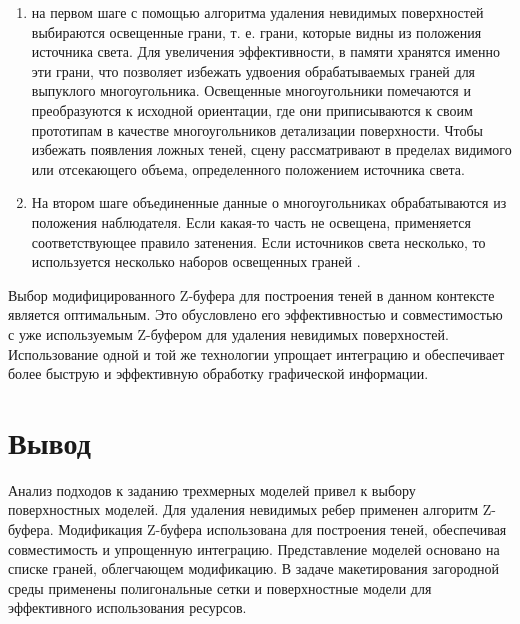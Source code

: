 \begin{enumerate}
\item на первом шаге с помощью алгоритма удаления невидимых поверхностей выбираются освещенные грани, т. е. грани, которые видны из положения источника света. Для увеличения эффективности, в памяти хранятся именно эти грани, что позволяет избежать удвоения обрабатываемых граней для выпуклого многоугольника. Освещенные многоугольники помечаются и преобразуются к исходной ориентации, где они приписываются к своим прототипам в качестве многоугольников детализации поверхности. Чтобы избежать появления ложных теней, сцену рассматривают в пределах видимого или отсекающего объема, определенного положением источника света.
\item На втором шаге объединенные данные о многоугольниках обрабатываются из положения наблюдателя. Если какая-то часть не освещена, применяется соответствующее правило затенения. Если источников света несколько, то используется несколько наборов освещенных граней \cite{letion}.
\end{enumerate}

Выбор модифицированного Z-буфера для построения теней в данном контексте является оптимальным. Это обусловлено его эффективностью и совместимостью с уже используемым Z-буфером для удаления невидимых поверхностей. Использование одной и той же технологии упрощает интеграцию и обеспечивает более быструю и эффективную обработку графической информации.

\section{Вывод}

Анализ подходов к заданию трехмерных моделей привел к выбору поверхностных моделей. Для удаления невидимых ребер применен алгоритм Z-буфера. Модификация Z-буфера использована для построения теней, обеспечивая совместимость и упрощенную интеграцию. Представление моделей основано на списке граней, облегчающем модификацию. В задаче макетирования загородной среды применены полигональные сетки и поверхностные модели для эффективного использования ресурсов.